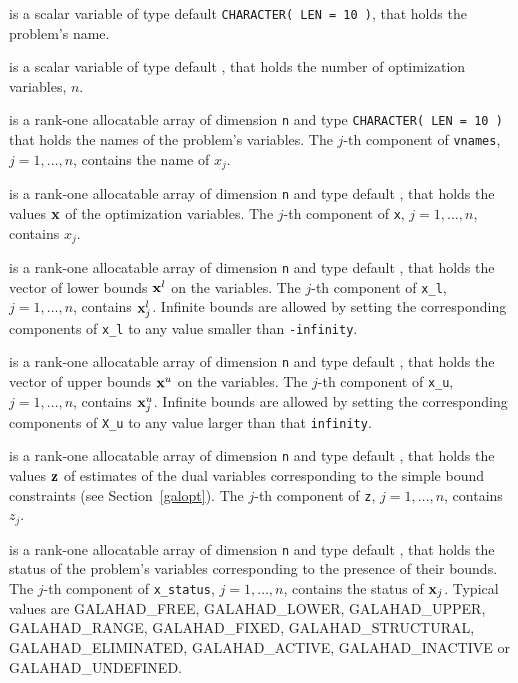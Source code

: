 \documentclass{galahad}
\newcommand{\sym}{\sf\small}
\begin{document}
\begin{description}
 is a scalar variable of type default {\tt CHARACTER( LEN = 10 )},
that holds the problem's name.

 is a scalar variable of type default \integer, 
 that holds the number of optimization variables, $n$.  

 is a rank-one allocatable array of dimension {\tt n} and type 
{\tt CHARACTER( LEN = 10 )} that holds the names of the problem's
variables. The $j$-th component of {\tt vnames}, $j = 1,  \ldots , n$, 
contains the name of $x_{j}$.  
              
 is a rank-one allocatable array of dimension {\tt n} and type 
default \realdp, 
that holds the values ${\mathbf{x}}$ of the optimization variables.
The $j$-th component of {\tt x}, $j = 1,  \ldots , n$, contains $x_{j}$.  

 is a rank-one allocatable array of dimension {\tt n} and type 
default \realdp, that holds
the vector of lower bounds ${\mathbf{x}}^{l}$ on the variables.
The $j$-th component of {\tt x\_l}, $j = 1, \ldots , n$, 
contains ${\mathbf{x}}_{j}^{l}$.
Infinite bounds are allowed by setting the corresponding 
components of {\tt x\_l} to any value smaller than {\tt -infinity}.

 is a rank-one allocatable array of dimension {\tt n} and type 
default \realdp, that holds
the vector of upper bounds ${\mathbf{x}}^{u}$ on the variables.
The $j$-th component of {\tt x\_u}, $j = 1, \ldots , n$, 
contains ${\mathbf{x}}_{j}^{u}$.
Infinite bounds are allowed by setting the corresponding 
components of {\tt X\_u} to any value larger than that {\tt infinity}. 

 is a rank-one allocatable array of dimension {\tt n} and type default 
\realdp, that holds
the values ${\mathbf{z}}$ of estimates  of the dual variables 
corresponding to the simple bound constraints (see Section~\ref{galopt}).
The $j$-th component of {\tt z}, $j = 1,  \ldots ,  n$, contains $z_{j}$.  

 is  a rank-one allocatable array of dimension {\tt n} and type 
default \integer, that holds the status of the problem's variables
corresponding to the presence of their bounds. The $j$-th component of 
{\tt x\_status}, $j = 1,  \ldots ,  n$, contains the status of ${\mathbf{x}}_j$.
Typical values are
{\sym GALAHAD\_FREE},  {\sym GALAHAD\_LOWER}, {\sym GALAHAD\_UPPER},
{\sym GALAHAD\_RANGE}, {\sym GALAHAD\_FIXED}, {\sym GALAHAD\_STRUCTURAL},
{\sym GALAHAD\_ELIMINATED}, {\sym GALAHAD\_ACTIVE}, 
{\sym GALAHAD\_INACTIVE} or {\sym GALAHAD\_UNDEFINED}.
        

\end{description}
\end{document}
